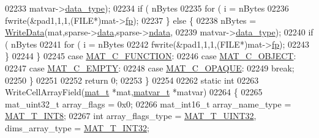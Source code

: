 \begin{DoxyCode}
{{{{{{{{{{{{{{{{02233                                    matvar->\hyperlink{group___m_a_t_ab6aafe9bd77f0f077852593dec438144}{data\_type});
02234                 \textcolor{keywordflow}{if} ( nBytes %
02235                     \textcolor{keywordflow}{for} ( i = nBytes %
02236                         fwrite(&pad1,1,1,(FILE*)mat->\hyperlink{struct__mat__t_a85f562e407ca9ad4d2a6e14f839432b7}{fp});
02237             \} \textcolor{keywordflow}{else} \{
02238                 nBytes = \hyperlink{mat5_8c_a1bec2ccf2a3b48706edd32e63744d364}{WriteData}(mat,sparse->\hyperlink{group___m_a_t_ae2c648cb9eac4ce47f26cddb44246152}{data},sparse->\hyperlink{group___m_a_t_a1beb8a8c58a808207cbea650563a9b63}{ndata},
02239                                    matvar->\hyperlink{group___m_a_t_ab6aafe9bd77f0f077852593dec438144}{data\_type});
02240                 \textcolor{keywordflow}{if} ( nBytes %
02241                     \textcolor{keywordflow}{for} ( i = nBytes %
02242                         fwrite(&pad1,1,1,(FILE*)mat->\hyperlink{struct__mat__t_a85f562e407ca9ad4d2a6e14f839432b7}{fp});
02243             \}
02244         \}
02245         \textcolor{keywordflow}{case} \hyperlink{group___m_a_t_ggad4d60ae7b709fc81bfd744fb4c857c40aaa9bf08312779cd1ab8e504a162ddcea}{MAT\_C\_FUNCTION}:
02246         \textcolor{keywordflow}{case} \hyperlink{group___m_a_t_ggad4d60ae7b709fc81bfd744fb4c857c40afe45104b68b044c83a2f99e349fa1ea6}{MAT\_C\_OBJECT}:
02247         \textcolor{keywordflow}{case} \hyperlink{group___m_a_t_ggad4d60ae7b709fc81bfd744fb4c857c40a5c76eef0ca0373d25abe49053be6fa9a}{MAT\_C\_EMPTY}:
02248         \textcolor{keywordflow}{case} \hyperlink{group___m_a_t_ggad4d60ae7b709fc81bfd744fb4c857c40ad83c684d250e463c1a3779647695c0c9}{MAT\_C\_OPAQUE}:
02249             \textcolor{keywordflow}{break};
02250     \}
02251 
02252     \textcolor{keywordflow}{return} 0;
02253 \}
02254 
02262 \textcolor{keyword}{static} \textcolor{keywordtype}{int}
02263 WriteCellArrayField(\hyperlink{struct__mat__t}{mat\_t} *mat,\hyperlink{group___m_a_t_structmatvar__t}{matvar\_t} *matvar)
02264 \{
02265     mat\_uint32\_t array\_flags = 0x0;
02266     mat\_int16\_t array\_name\_type = \hyperlink{group___m_a_t_ggacf7b3b879282b7ab3a51190e49bf3453a9807f5033ed4f9b548953742d9fd1658}{MAT\_T\_INT8};
02267     \textcolor{keywordtype}{int} array\_flags\_type = \hyperlink{group___m_a_t_ggacf7b3b879282b7ab3a51190e49bf3453aa397e285a23fe240368b752897652c6a}{MAT\_T\_UINT32}, dims\_array\_type = 
      \hyperlink{group___m_a_t_ggacf7b3b879282b7ab3a51190e49bf3453a83e06a68320726c6572bfbb9f3addb1d}{MAT\_T\_INT32};
}}}}}}}}}}}}}}}}
\end{DoxyCode}
